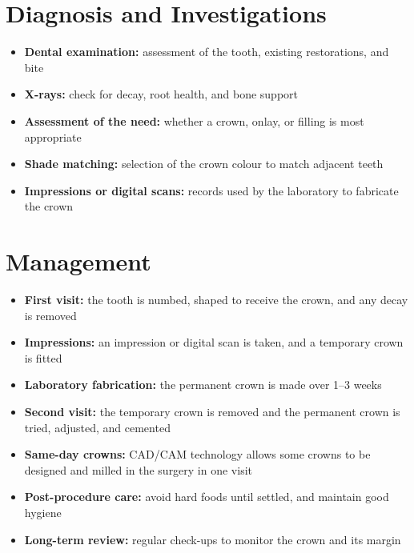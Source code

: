 \section*{Diagnosis and Investigations}
\begin{itemize}
    \item \textbf{Dental examination:} assessment of the tooth, existing restorations, and bite
    \item \textbf{X-rays:} check for decay, root health, and bone support
    \item \textbf{Assessment of the need:} whether a crown, onlay, or filling is most appropriate
    \item \textbf{Shade matching:} selection of the crown colour to match adjacent teeth
    \item \textbf{Impressions or digital scans:} records used by the laboratory to fabricate the crown
\end{itemize}

\section*{Management}
\begin{itemize}
    \item \textbf{First visit:} the tooth is numbed, shaped to receive the crown, and any decay is removed
    \item \textbf{Impressions:} an impression or digital scan is taken, and a temporary crown is fitted
    \item \textbf{Laboratory fabrication:} the permanent crown is made over 1--3 weeks
    \item \textbf{Second visit:} the temporary crown is removed and the permanent crown is tried, adjusted, and cemented
    \item \textbf{Same-day crowns:} CAD/CAM technology allows some crowns to be designed and milled in the surgery in one visit
    \item \textbf{Post-procedure care:} avoid hard foods until settled, and maintain good hygiene
    \item \textbf{Long-term review:} regular check-ups to monitor the crown and its margin
\end{itemize}

